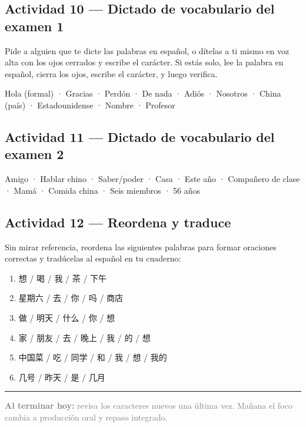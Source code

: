 \documentclass[12pt, a4paper]{article}
\begin{document}
\subsection{Actividad 10 — Dictado de vocabulario del examen 1}

Pide a alguien que te dicte las palabras en español, o dítelas a ti mismo en voz alta con los ojos cerrados y escribe el carácter. Si estás solo, lee la palabra en español, cierra los ojos, escribe el carácter, y luego verifica.

\begin{cuadrogris}
Hola (formal) · Gracias · Perdón · De nada · Adiós · Nosotros · China (país) · Estadounidense · Nombre · Profesor
\end{cuadrogris}

\subsection{Actividad 11 — Dictado de vocabulario del examen 2}

\begin{cuadrogris}
Amigo · Hablar chino · Saber/poder · Casa · Este año · Compañero de clase · Mamá · Comida china · Seis miembros · 56 años
\end{cuadrogris}

\subsection{Actividad 12 — Reordena y traduce}

Sin mirar referencia, reordena las siguientes palabras para formar oraciones correctas y tradúcelas al español en tu cuaderno:

\begin{enumerate}[leftmargin=1.5cm]
\item 想 / 喝 / 我 / 茶 / 下午
\item 星期六 / 去 / 你 / 吗 / 商店
\item 做 / 明天 / 什么 / 你 / 想
\item 家 / 朋友 / 去 / 晚上 / 我 / 的 / 想
\item 中国菜 / 吃 / 同学 / 和 / 我 / 想 / 我的
\item 几号 / 昨天 / 是 / 几月
\end{enumerate}

\vspace{1em}
\hrule
\vspace{0.5em}

\begin{center}
\textcolor{gray}{\small \textbf{Al terminar hoy:} revisa los caracteres nuevos una última vez. Mañana el foco cambia a producción oral y repaso integrado.}
\end{center}
\end{document}
